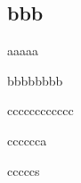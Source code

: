 \documentclass[10pt,dvipdfmx]{beamer}
\begin{document}
\begin{frame}
  \section{bbb}
  \begin{block}
    aaaaa
  \end{block}
  \begin{alertblock}
    bbbbbbbb
  \end{alertblock}
  \begin{exampleblock}
    cccccccccccc
  \end{exampleblock}
  \begin{exampleblock}
    cccccca
  \end{exampleblock}
  \begin{exampleblock}
    cccccs
  \end{exampleblock}
\end{frame}
\frame{}
\frame{}
\frame{}
\frame{}
\end{document}
